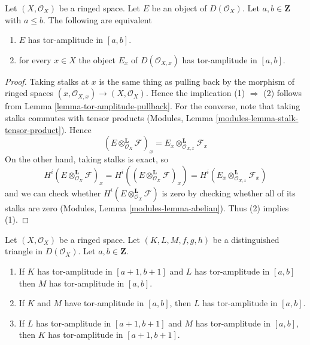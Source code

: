 \begin{lemma}
\label{lemma-tor-amplitude-stalk}
Let $(X, \mathcal{O}_X)$ be a ringed space.
Let $E$ be an object of $D(\mathcal{O}_X)$.
Let $a, b \in \mathbf{Z}$ with $a \leq b$. The following are equivalent
\begin{enumerate}
\item $E$ has tor-amplitude in $[a, b]$.
\item for every $x \in X$ the object $E_x$ of $D(\mathcal{O}_{X, x})$
has tor-amplitude in $[a, b]$.
\end{enumerate}
\end{lemma}

\begin{proof}
Taking stalks at $x$ is the same thing as pulling back by the
morphism of ringed spaces $(x, \mathcal{O}_{X, x}) \to (X, \mathcal{O}_X)$.
Hence the implication (1) $\Rightarrow$ (2) follows from
Lemma \ref{lemma-tor-amplitude-pullback}.
For the converse, note that taking stalks commutes with tensor
products (Modules, Lemma \ref{modules-lemma-stalk-tensor-product}).
Hence
$$
(E \otimes_{\mathcal{O}_X}^\mathbf{L} \mathcal{F})_x =
E_x \otimes_{\mathcal{O}_{X, x}}^\mathbf{L} \mathcal{F}_x
$$
On the other hand, taking stalks is exact, so
$$
H^i(E \otimes_{\mathcal{O}_X}^\mathbf{L} \mathcal{F})_x =
H^i((E \otimes_{\mathcal{O}_X}^\mathbf{L} \mathcal{F})_x) =
H^i(E_x \otimes_{\mathcal{O}_{X, x}}^\mathbf{L} \mathcal{F}_x)
$$
and we can check whether
$H^i(E \otimes_{\mathcal{O}_X}^\mathbf{L} \mathcal{F})$ is zero
by checking whether all of its stalks are zero
(Modules, Lemma \ref{modules-lemma-abelian}). Thus (2) implies (1).
\end{proof}

\begin{lemma}
\label{lemma-cone-tor-amplitude}
Let $(X, \mathcal{O}_X)$ be a ringed space.
Let $(K, L, M, f, g, h)$ be a distinguished
triangle in $D(\mathcal{O}_X)$. Let $a, b \in \mathbf{Z}$.
\begin{enumerate}
\item If $K$ has tor-amplitude in $[a + 1, b + 1]$ and
$L$ has tor-amplitude in $[a, b]$ then $M$ has
tor-amplitude in $[a, b]$.
\item If $K$ and $M$ have tor-amplitude in $[a, b]$, then
$L$ has tor-amplitude in $[a, b]$.
\item If $L$ has tor-amplitude in $[a + 1, b + 1]$
and $M$ has tor-amplitude in $[a, b]$, then
$K$ has tor-amplitude in $[a + 1, b + 1]$.
\end{enumerate}
\end{lemma}


